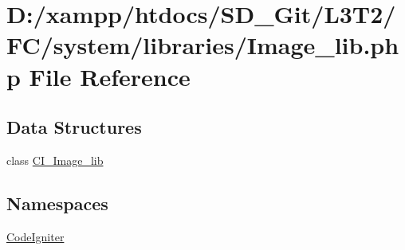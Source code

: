 \hypertarget{system_2libraries_2_image__lib_8php}{}\section{D\+:/xampp/htdocs/\+S\+D\+\_\+\+Git/\+L3\+T2/\+F\+C/system/libraries/\+Image\+\_\+lib.php File Reference}
\label{system_2libraries_2_image__lib_8php}
\subsection*{Data Structures}
\begin{DoxyCompactItemize}
\item 
class \hyperlink{class_c_i___image__lib}{C\+I\+\_\+\+Image\+\_\+lib}
\end{DoxyCompactItemize}
\subsection*{Namespaces}
\begin{DoxyCompactItemize}
\item 
 \hyperlink{namespace_code_igniter}{Code\+Igniter}
\end{DoxyCompactItemize}
